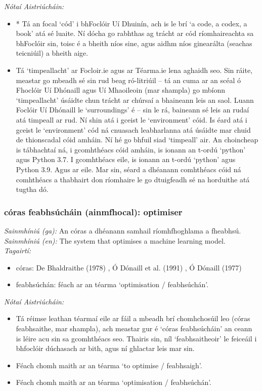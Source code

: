  \noindent \textit{Nótaí Aistriúcháin:}
\begin{itemize}
	\item * Tá an focal `cód' i bhFoclóir Uí Dhuinín, ach is le brí `a code, a codex, a book' atá sé luaite. Ní dócha go rabhthas ag trácht ar cód ríomhaireachta sa bhFoclóir sin, toisc é a bheith níos sine, agus aidhm níos ginearálta (seachas teicniúil) a bheith aige.
	\item Tá `timpeallacht' ar Focloir.ie agus ar Téarma.ie lena aghaidh seo. Sin ráite, meastar go mbeadh sé sin rud beag ró-litriúil -- tá an cuma ar an scéal ó Fhoclóir Uí Dhónaill agus Uí Mhaoileoin (mar shampla) go mbíonn `timpeallacht' úsáidte chun trácht ar chúrsaí a bhaineann leis an saol. Luann Foclóir Uí Dhónaill le `surroundings' é -- sin le rá, baineann sé leis an rudaí atá timpeall ar rud. Ní shin atá i gceist le `environment' cóid. Is éard atá i gceist le `environment' cód ná cnuasach leabharlanna atá úsáidte mar chuid de thionscadal cóid amháin. Ní hé go bhfuil siad `timpeall' air. An choincheap is tábhachtaí ná, i gcomhthéacs cóid amháin, is ionann an t-ordú `python' agus Python 3.7. I gcomhthéacs eile, is ionann an t-ordú `python' agus Python 3.9. Agus ar eile. Mar sin, séard a dhéanann comhthéacs cóid ná comhthéacs a thabhairt don ríomhaire le go dtuigfeadh sé na horduithe atá tugtha dó.
\end{itemize}


\subsubsection*{córas feabhsúcháin (ainmfhocal): optimiser}
 \noindent \textit{Sainmhíniú (ga):} An córas a dhéanann samhail ríomhfhoghlama a fheabhsú.
\\
 \noindent \textit{Sainmhíniú (en):} The system that optimises a machine learning model.
\\
 \noindent \textit{Tagairtí:}
\begin{itemize}
	\item córas: De Bhaldraithe (1978) \cite{de-bhaldraithe}, Ó Dónaill et al. (1991) \cite{focloir-beag}, Ó Dónaill (1977) \cite{odonaill}
	\item feabhsúchán: féach ar an téarma `optimisation / feabhsúchán'.
\end{itemize}

 \noindent \textit{Nótaí Aistriúcháin:}
\begin{itemize}
	\item Tá réimse leathan téarmaí eile ar fáil a mbeadh brí chomhchosúil leo (córas feabhsaithe, mar shampla), ach meastar gur é `córas feabhsúcháin' an ceann is léire acu sin sa gcomhthéacs seo. Thairis sin, níl `feabhsaitheoir' le feiceáil i bhfoclóir dúchasach ar bith, agus ní ghlactar leis mar sin.
	\item Féach chomh maith ar an téarma `to optimise / feabhsaigh'.
	\item Féach chomh maith ar an téarma `optimisation / feabhsúchán'.
\end{itemize}


